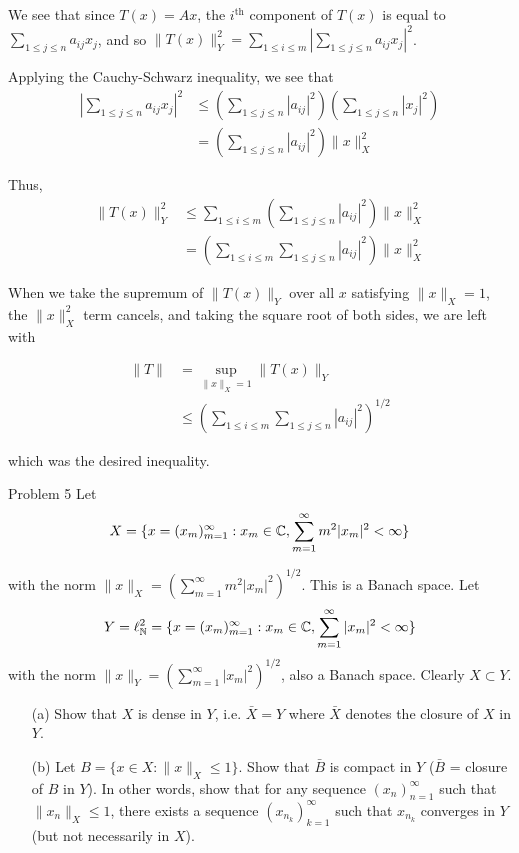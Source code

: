 \documentclass{hmwk}
\begin{document}
\begin{solution}

\pre We see that since $T(x) = Ax$, the $i^\text{th}$ component of $T(x)$ is equal to $\sum_{1 \leq j \leq n} a_{ij}x_j$, and so $\|T(x)\|^2_Y = \sum_{1 \leq i \leq m} \left| \sum_{1 \leq j \leq n} a_{ij}x_j\right|^2$. 

\pre Applying the Cauchy-Schwarz inequality, we see that 
\begin{align*}
    \left| \sum_{1 \leq j \leq n} a_{ij}x_j\right|^2 &\leq \left(\sum_{1 \leq j \leq n} |a_{ij}|^2\right) \left(\sum_{1 \leq j \leq n} |x_j|^2\right) \\
    &= \left(\sum_{1 \leq j \leq n} |a_{ij}|^2\right) \|x\|^2_X
\end{align*}

\pre Thus, \begin{align*}
    \|T(x)\|^2_Y &\leq \sum_{1 \leq i \leq m} \left(\sum_{1 \leq j \leq n} |a_{ij}|^2\right) \|x\|^2_X \\
    &= \left(\sum_{1 \leq i \leq m} \sum_{1 \leq j \leq n} |a_{ij}|^2\right)\|x\|_X^2
\end{align*}

\pre When we take the supremum of $\|T(x)\|_Y$ over all $x$ satisfying $\|x\|_X = 1$, the $\|x\|_X^2$ term cancels, and taking the square root of both sides, we are left with 

\begin{align*}
    \|T\| &= \sup_{\|x\|_X = 1} \|T(x)\|_Y \\
    &\leq \left(\sum_{1 \leq i \leq m} \sum_{1 \leq j \leq n} |a_{ij}|^2\right)^{1/2}
\end{align*}

\pre which was the desired inequality.
\end{solution}

\begin{problem}{Problem 5}
Let $$X = \{x = (x_m)_{m = 1}^\infty : x_m \in \mathbb{C}, \sum_{m =1}^\infty m^2|x_m|^2 < \infty\}$$

\pre with the norm $\|x\|_X = \left(\sum_{m =1}^\infty m^2|x_m|^2\right)^{1/2}$. This is a Banach space. Let
$$Y = \ell_{\mathbb{N}}^2 = \{x = (x_m)_{m = 1}^\infty : x_m \in \mathbb{C}, \sum_{m =1}^\infty |x_m|^2 < \infty \}$$ with the norm $\|x\|_Y = \left(\sum_{m =1}^\infty |x_m|^2\right)^{1/2}$, also a Banach space. Clearly $X \subset Y$. 
\begin{itemize}
    \item[(a)] Show that $X$ is dense in $Y$, i.e. $\bar{X} = Y$ where $\bar{X}$ denotes the closure of $X$ in $Y$.
    \item[(b)] Let $B = \{x \in X : \|x\|_X \leq 1\}$. Show that $\bar{B}$ is compact in $Y$ ($\bar{B}$ = closure of $B$ in $Y$). In other words, show that for any sequence $(x_n)_{n=1}^\infty$ such that $\|x_n\|_X \leq 1$, there exists a sequence $(x_{n_k})_{k=1}^\infty$ such that $x_{n_k}$ converges in $Y$ (but not necessarily in $X$).
\end{itemize}
\end{problem}
\end{document}

